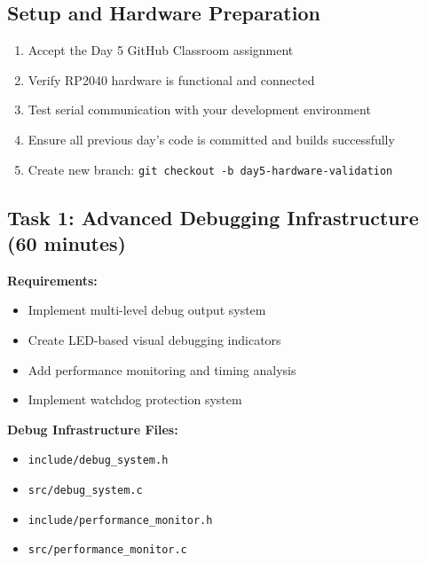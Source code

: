 \documentclass[11pt,a4paper]{article}
\begin{document}
\subsection{Setup and Hardware Preparation}
\begin{enumerate}
    \item Accept the Day 5 GitHub Classroom assignment
    \item Verify RP2040 hardware is functional and connected
    \item Test serial communication with your development environment
    \item Ensure all previous day's code is committed and builds successfully
    \item Create new branch: \texttt{git checkout -b day5-hardware-validation}
\end{enumerate}

\subsection{Task 1: Advanced Debugging Infrastructure (60 minutes)}

\textbf{Requirements:}
\begin{itemize}
    \item Implement multi-level debug output system
    \item Create LED-based visual debugging indicators
    \item Add performance monitoring and timing analysis
    \item Implement watchdog protection system
\end{itemize}

\textbf{Debug Infrastructure Files:}
\begin{itemize}
    \item \texttt{include/debug\_system.h}
    \item \texttt{src/debug\_system.c}
    \item \texttt{include/performance\_monitor.h}
    \item \texttt{src/performance\_monitor.c}
\end{itemize}
\end{document}
